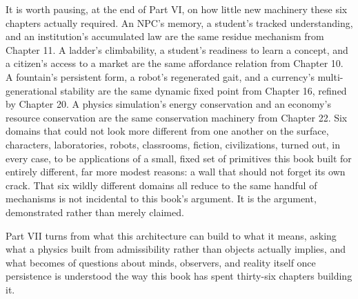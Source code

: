 It is worth pausing, at the end of Part VI, on how little new machinery these six chapters actually required. An NPC's memory, a student's tracked understanding, and an institution's accumulated law are the same residue mechanism from Chapter 11. A ladder's climbability, a student's readiness to learn a concept, and a citizen's access to a market are the same affordance relation from Chapter 10. A fountain's persistent form, a robot's regenerated gait, and a currency's multi-generational stability are the same dynamic fixed point from Chapter 16, refined by Chapter 20. A physics simulation's energy conservation and an economy's resource conservation are the same conservation machinery from Chapter 22. Six domains that could not look more different from one another on the surface, characters, laboratories, robots, classrooms, fiction, civilizations, turned out, in every case, to be applications of a small, fixed set of primitives this book built for entirely different, far more modest reasons: a wall that should not forget its own crack. That six wildly different domains all reduce to the same handful of mechanisms is not incidental to this book's argument. It is the argument, demonstrated rather than merely claimed.

Part VII turns from what this architecture can build to what it means, asking what a physics built from admissibility rather than objects actually implies, and what becomes of questions about minds, observers, and reality itself once persistence is understood the way this book has spent thirty-six chapters building it.
